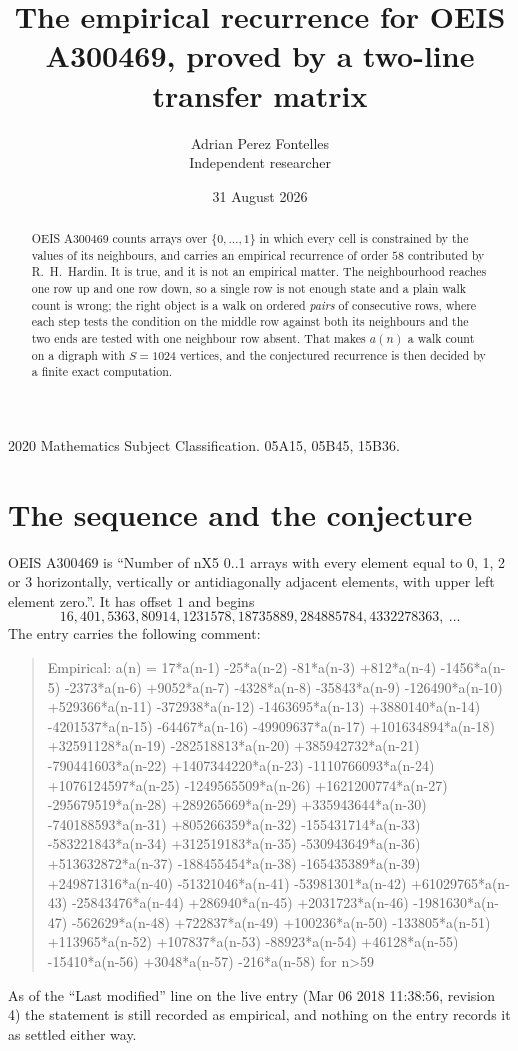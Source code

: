 \documentclass[11pt,a4paper]{article}
\title{The empirical recurrence for OEIS A300469, proved by a two-line transfer matrix}
\author{Adrian Perez Fontelles\\ \small Independent researcher}
\date{31 August 2026}
\theoremstyle{plain}
\theoremstyle{definition}
\begin{document}
\maketitle

\begin{abstract}
OEIS A300469 counts arrays over $\{0,\dots,1\}$ in which every cell is constrained by the
values of its neighbours, and carries an empirical recurrence of order $58$ contributed
by R.~H.~Hardin. It is true, and it is not an empirical matter. The neighbourhood reaches one
row up and one row down, so a single row is not enough state and a plain walk count
is wrong; the right object is a walk on ordered \emph{pairs} of consecutive rows, where
each step tests the condition on the middle row against both its neighbours and the two
ends are tested with one neighbour row absent. That makes $a(n)$ a walk count on a digraph
with $S=1024$ vertices, and the conjectured recurrence is then decided by a finite exact
computation.
\end{abstract}

\noindent\small 2020 Mathematics Subject Classification. 05A15, 05B45, 15B36.\normalsize

\section{The sequence and the conjecture}

OEIS A300469 is ``Number of nX5 0..1 arrays with every element equal to 0, 1, 2 or 3 horizontally, vertically or antidiagonally adjacent elements, with upper left element zero.''. It has offset $1$ and begins
\[
16, 401, 5363, 80914, 1231578, 18735889, 284885784, 4332278363,\ \dots
\]
The entry carries the following comment:
\begin{quote}\small
Empirical: a(n) = 17*a(n-1) -25*a(n-2) -81*a(n-3) +812*a(n-4) -1456*a(n-5) -2373*a(n-6) +9052*a(n-7) -4328*a(n-8) -35843*a(n-9) -126490*a(n-10) +529366*a(n-11) -372938*a(n-12) -1463695*a(n-13) +3880140*a(n-14) -4201537*a(n-15) -64467*a(n-16) -49909637*a(n-17) +101634894*a(n-18) +32591128*a(n-19) -282518813*a(n-20) +385942732*a(n-21) -790441603*a(n-22) +1407344220*a(n-23) -1110766093*a(n-24) +1076124597*a(n-25) -1249565509*a(n-26) +1621200774*a(n-27) -295679519*a(n-28) +289265669*a(n-29) +335943644*a(n-30) -740188593*a(n-31) +805266359*a(n-32) -155431714*a(n-33) -583221843*a(n-34) +312519183*a(n-35) -530943649*a(n-36) +513632872*a(n-37) -188455454*a(n-38) -165435389*a(n-39) +249871316*a(n-40) -51321046*a(n-41) -53981301*a(n-42) +61029765*a(n-43) -25843476*a(n-44) +286940*a(n-45) +2031723*a(n-46) -1981630*a(n-47) -562629*a(n-48) +722837*a(n-49) +100236*a(n-50) -133805*a(n-51) +113965*a(n-52) +107837*a(n-53) -88923*a(n-54) +46128*a(n-55) -15410*a(n-56) +3048*a(n-57) -216*a(n-58) for n>59
\end{quote}
As of the ``Last modified'' line on the live entry (Mar 06 2018 11:38:56, revision 4) the statement is
still recorded as empirical, and nothing on the entry records it as settled either way.
\end{document}
